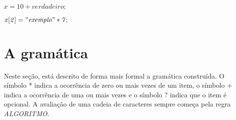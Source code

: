 \documentclass[
12pt,				%
a4paper,			%
english,			%
french,				%
spanish,			%
brazil,				%
article
]{abntex2}
\begin{document}
\begin{math}
	\mathit{x = 10 + verdadeiro;}
\end{math}

\begin{math}
	\mathit{x[2] = "exemplo" * 7;}
\end{math}


\section{A gramática}
Neste seção, está descrito de forma mais formal a gramática construída. O símbolo * indica a ocorrência de zero ou mais vezes de um item, o símbolo + indica a ocorrência de uma ou mais vezes e o símbolo ? indica que o item é opcional.
A avaliação de uma cadeia de caracteres sempre começa pela regra \textit{ALGORITMO}.
\end{document}
